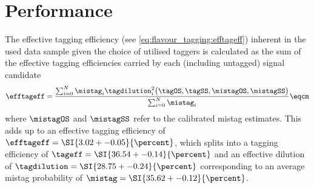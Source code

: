 \section{Performance}
\label{sec:flavour_tagging:performance}

The effective tagging efficiency (see \cref{eq:flavour_tagging:efftageff})
inherent in the used data sample given the choice of utilised taggers is
calculated as the sum of the effective tagging efficiencies carried by each
(including untagged) signal candidate
%
\begin{equation}
  \efftageff = \frac{\sum_{i=0}^{N} \mistag_i \tagdilution_i^2\big(\tagOS, \tagSS, \mistagOS, \mistagSS \big)}{\sum_{i=0}^{N} \mistag_i}\eqcm
\end{equation}
%
where $\mistagOS$ and $\mistagSS$ refer to the calibrated mistag estimates. This
adds up to an effective tagging efficiency of $\efftageff = \SI{3.02 +-
0.05}{\percent}$, which splits into a tagging efficiency of $\tageff = \SI{36.54
+- 0.14}{\percent}$ and an effective dilution of $\tagdilution = \SI{28.75 +-
0.24}{\percent}$ corresponding to an average mistag probability of $\mistag =
\SI{35.62 +- 0.12}{\percent}$.

